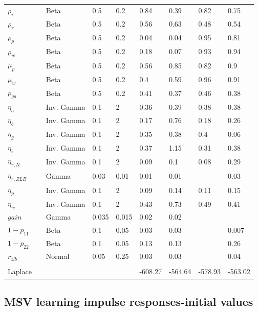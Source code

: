 \documentclass[12pt,reqno]{article}
\numberwithin{equation}{section}
\begin{document}
\begin{table}[H]
\begin{tabular}{l|llll|llll}
$\rho_i$ &  & Beta & 0.5 & 0.2 & 0.84 & 0.39 & 0.82 & 0.75 \\
$\rho_r$ &  & Beta & 0.5 & 0.2 & 0.56 & 0.63 & 0.48 & 0.54 \\
$\rho_p$ &  & Beta & 0.5 & 0.2 & 0.04 & 0.04 & 0.95 & 0.81 \\
$\rho_w$ &  & Beta & 0.5 & 0.2 & 0.18 & 0.07 & 0.93 & 0.94 \\
$\mu_p$ &  & Beta & 0.5 & 0.2 & 0.56 & 0.85 & 0.82 & 0.9 \\
$\mu_w$ &  & Beta & 0.5 & 0.2 & 0.4 & 0.59 & 0.96 & 0.91 \\
$\rho_{ga}$ &  & Beta & 0.5 & 0.2 & 0.41 & 0.37 & 0.46 & 0.38 \\
\hline
$\eta_a$ &  & Inv. Gamma & 0.1 & 2 & 0.36 & 0.39 & 0.38 & 0.38 \\
$\eta_b$ &  & Inv. Gamma & 0.1 & 2 & 0.17 & 0.76 & 0.18 & 0.26 \\
$\eta_g$ &  & Inv. Gamma & 0.1 & 2 & 0.35 & 0.38 & 0.4 & 0.06 \\
$\eta_i$ &  & Inv. Gamma & 0.1 & 2 & 0.37 & 1.15 & 0.31 & 0.38 \\
$\eta_{r,N}$ &  & Inv. Gamma & 0.1 & 2 & 0.09 & 0.1 & 0.08 & 0.29 \\
$\eta_{r,ZLB}$ &  & Gamma & 0.03 & 0.01 & 0.01 & 0.01 &  & 0.03 \\
$\eta_p$ &  & Inv. Gamma & 0.1 & 2 & 0.09 & 0.14 & 0.11 & 0.15 \\
$\eta_w$ &  & Inv. Gamma & 0.1 & 2 & 0.43 & 0.73 & 0.49 & 0.41 \\
\hline
$gain$ &  & Gamma & 0.035 & 0.015 & 0.02 & 0.02 &  &  \\
$1-p_{11}$ &  & Beta & 0.1 & 0.05 & 0.03 & 0.03 &  & 0.007 \\
$1-p_{22}$ &  & Beta & 0.1 & 0.05 & 0.13 & 0.13 &  & 0.26 \\
$\bar{r_{zlb}}$ &  & Normal & 0.05 & 0.25 & 0.03 & 0.03 &  & 0.04 \\
 &  &  &  &  &  &  &  &  \\
Laplace &  &  &  &  & -608.27 & -564.64 & -578.93 & -563.02
\end{tabular}
\end{table}


\newpage
\subsection*{MSV learning impulse responses-initial values}
\end{document}
